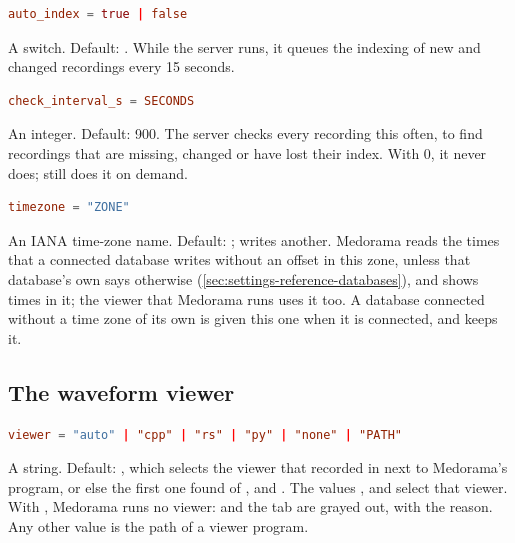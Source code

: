 \begin{lstlisting}[style=signature,language=TOML]
auto_index = true | false
\end{lstlisting}
A switch. Default: . While the server runs, it queues the indexing of new and changed
recordings every 15 seconds.

\begin{lstlisting}[style=signature,language=TOML]
check_interval_s = SECONDS
\end{lstlisting}
An integer. Default: 900. The server checks every recording this often, to find recordings
that are missing, changed or have lost their index. With 0, it never does; 
still does it on demand.

\begin{lstlisting}[style=signature,language=TOML]
timezone = "ZONE"
\end{lstlisting}
An IANA time-zone name. Default: ;  writes
another. Medorama reads the times that a connected database writes without an offset in this
zone, unless that database's own  says otherwise
(\cref{sec:settings-reference-databases}), and shows times in it; the viewer that Medorama runs
uses it too. A database connected without a time zone of its own is given this one when it is
connected, and keeps it.

\subsection{The waveform viewer}
\label{sec:settings-reference-viewer}

\begin{lstlisting}[style=signature,language=TOML]
viewer = "auto" | "cpp" | "rs" | "py" | "none" | "PATH"
\end{lstlisting}
A string. Default: , which selects the viewer that 
recorded in  next to Medorama's program, or else the first one found of
,  and . The values ,
 and  select that viewer. With , Medorama runs no viewer:
 and the  tab are grayed out, with the reason. Any other value is the
path of a viewer program.

